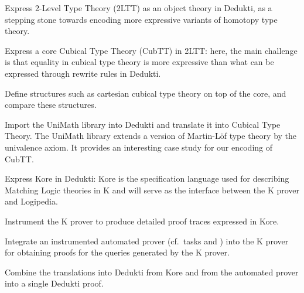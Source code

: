 \begin{workpackage}
\begin{tasklist}
\begin{task}[id=hott,
  title=Express Cubical Type Theory in Dedukti,
  shorttitle=CuTT,
  lead=Inr, %
  InrRM=42, %
  BirRM=3,  %
  LeeRM=3,  %
  wphases=1-48,
  ]
  \vspace{-5mm}
  \begin{compactitem}
  \item Express 2-Level Type Theory (2LTT) as an object theory in Dedukti, as
    a stepping stone towards encoding more expressive variants of homotopy type
    theory.
  \item Express a core Cubical Type Theory (CubTT) in 2LTT: here, the main challenge is
    that equality in cubical type theory is more expressive than what can be
    expressed through rewrite rules in Dedukti.
  \item Define structures such as cartesian cubical type theory on top of the
    core, and compare these structures.
  \item Import the UniMath library into Dedukti and translate it into Cubical
    Type Theory. The UniMath library extends a version of
    Martin-Löf type theory by the univalence axiom. It provides an interesting
    case study for our encoding of CubTT.
  \end{compactitem}
\end{task}

\begin{task}[id=matching,
  title=Express Matching Logic in Dedukti and instrument the K prover,
  shorttitle=K,
  lead=Ias,
  IasRM=5,
  RunRM=7,
  wphases=1-36,
  ]
  \vspace{-5mm}
  \begin{compactitem}
  \item Express Kore in Dedukti: Kore is the specification language used for
    describing Matching Logic theories in K and will serve as the interface
    between the K prover and Logipedia.
  \item Instrument the K prover to produce detailed proof traces expressed in
    Kore.
  \item Integrate an instrumented automated prover (cf.\ tasks
     and ) into
    the K prover for obtaining proofs for the queries generated by the K prover.
  \item Combine the translations into Dedukti from Kore and from the automated
    prover into a single Dedukti proof.
  \end{compactitem}
\end{task}


\end{tasklist}
\end{workpackage}
